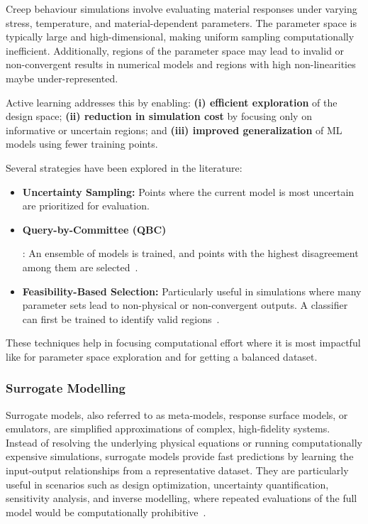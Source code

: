 \documentclass[class=scrbook, crop=false]{standalone}
\begin{document}

Creep behaviour simulations involve evaluating material responses under varying stress, temperature, and material-dependent parameters. The parameter space is typically large and high-dimensional, making uniform sampling computationally inefficient. Additionally, regions of the parameter space may lead to invalid or non-convergent results in numerical models and regions with high non-linearities maybe under-represented.

Active learning addresses this by enabling:  
\textbf{(i) efficient exploration} of the design space;  
\textbf{(ii) reduction in simulation cost} by focusing only on informative or uncertain regions; and  
\textbf{(iii) improved generalization} of ML models using fewer training points.


Several strategies have been explored in the literature:

\begin{itemize}
	\item \textbf{Uncertainty Sampling:} Points where the current model is most uncertain are prioritized for evaluation.
	\item \hypertarget{QBC}{\textbf{Query-by-Committee (QBC)}}: An ensemble of models is trained, and points with the highest disagreement among them are selected~\cite{burbidge2007qbc}.
	\item \textbf{Feasibility-Based Selection:} Particularly useful in simulations where many parameter sets lead to non-physical or non-convergent outputs. A classifier can first be trained to identify valid regions~\cite{heese2019optimized, morand2022efficient}.
\end{itemize}

These techniques help in focusing computational effort where it is most impactful like for parameter space exploration and for getting a balanced dataset.

\subsubsection{Surrogate Modelling}

Surrogate models, also referred to as meta-models, response surface models, or emulators, are simplified approximations of complex, high-fidelity systems. Instead of resolving the underlying physical equations or running computationally expensive simulations, surrogate models provide fast predictions by learning the input-output relationships from a representative dataset. They are particularly useful in scenarios such as design optimization, uncertainty quantification, sensitivity analysis, and inverse modelling, where repeated evaluations of the full model would be computationally prohibitive~\cite{forrester2009engineering, queipo2005surrogate}.
\end{document}
